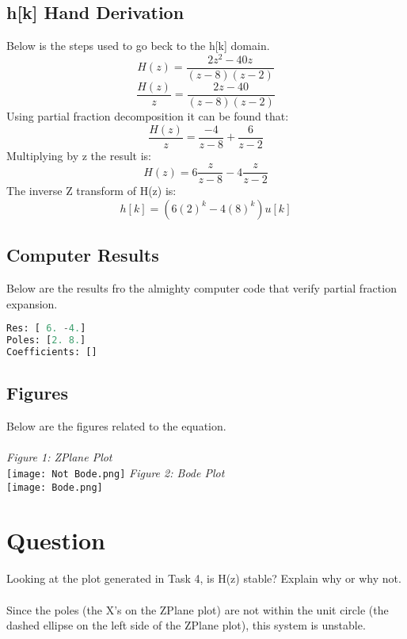 \documentclass[12pt,a4paper]{article}
\begin{document}
\subsection{h[k] Hand Derivation}
Below is the steps used to go beck to the h[k] domain.
$$H(z)=\frac{2z^2-40z}{(z-8)(z-2)}$$
$$\frac{H(z)}{z}=\frac{2z-40}{(z-8)(z-2)}$$
Using partial fraction decomposition it can be found that:
$$\frac{H(z)}{z}=\frac{-4}{z-8}+\frac{6}{z-2}$$
Multiplying by z the result is:
$$H(z)=6\frac{z}{z-8}-4\frac{z}{z-2}$$
The inverse Z transform of H(z) is:
$$h[k]=(6(2)^k-4(8)^k)u[k]$$
\subsection{Computer Results}
Below are the results fro the almighty computer code that verify partial fraction expansion.
\begin{lstlisting}[language=Python]
Res: [ 6. -4.]
Poles: [2. 8.]
Coefficients: []
\end{lstlisting}
\subsection{Figures}
Below are the figures related to the equation.\\
\\
\textit{Figure 1: ZPlane Plot}
\\
\texttt{[image: Not Bode.png]}
\newpage
\textit{Figure 2: Bode Plot}
\\
\texttt{[image: Bode.png]}
\newpage
\section{Question}
Looking at the plot generated in Task 4, is H(z) stable? Explain why or why not.\\
\\
Since the poles (the X's on the ZPlane plot) are not within the unit circle (the dashed ellipse on the left side of the ZPlane plot), this system is unstable.
\end{document}
